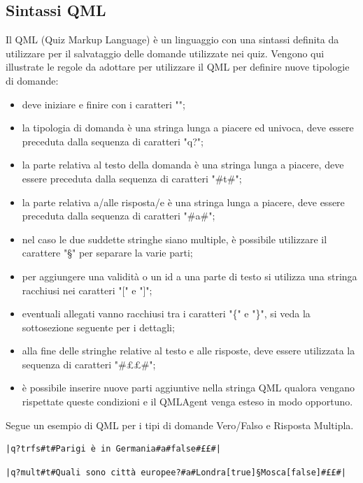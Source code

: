 \documentclass[a4paper, titlepage]{article}
\begin{document}
	\subsection{Sintassi QML}
	\label{qml}
	Il QML (Quiz Markup Language) è un linguaggio con una sintassi definita da utilizzare per il salvataggio delle domande utilizzate nei quiz.
	Vengono qui illustrate le regole da adottare per utilizzare il QML per definire nuove tipologie di domande:
	\begin{itemize}
		\item deve iniziare e finire con i caratteri "\textbar";
		\item la tipologia di domanda è una stringa lunga a piacere ed univoca, deve essere preceduta dalla sequenza di caratteri "q?";
		\item la parte relativa al testo della domanda è una stringa lunga a piacere, deve essere preceduta dalla sequenza di caratteri "\#t\#";
		\item la parte relativa a/alle risposta/e è una stringa lunga a piacere, deve essere preceduta dalla sequenza di caratteri "\#a\#";
		\item nel caso le due suddette stringhe siano multiple, è possibile utilizzare il carattere "§" per separare la varie parti;
		\item per aggiungere una validità o un id a una parte di testo si utilizza una stringa racchiusi  nei caratteri "[" e "]";
		\item eventuali allegati vanno racchiusi tra i caratteri "\{" e "\}", si veda la sottosezione seguente per i dettagli;
		\item alla fine delle stringhe relative al testo e alle risposte, deve essere utilizzata la sequenza di caratteri "\#££\#";
		\item è possibile inserire nuove parti aggiuntive nella stringa QML qualora vengano rispettate queste condizioni e il QMLAgent venga esteso in modo opportuno.
	\end{itemize}
	Segue un esempio di QML per i tipi di domande Vero/Falso e Risposta Multipla.
	\begin{verbatim}|q?trfs#t#Parigi è in Germania#a#false#££#|\end{verbatim}
	\begin{verbatim}|q?mult#t#Quali sono città europee?#a#Londra[true]§Mosca[false]#££#|\end{verbatim}
	
\end{document}

